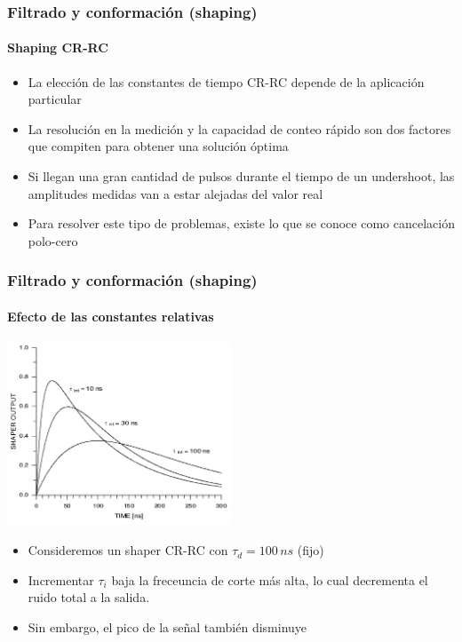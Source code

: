 \documentclass{beamer}
\begin{document}
\begin{frame}
\frametitle{Filtrado y conformación (shaping)}
\framesubtitle{{\color{blue}Shaping CR-RC}}
\begin{itemize}
\item La elección de las constantes de tiempo CR-RC depende de la aplicación
particular
\item La resolución en la medición y la capacidad de conteo rápido son dos
factores que compiten para obtener una solución {\color{blue}óptima} 
\item Si llegan una gran cantidad de pulsos durante el tiempo de un undershoot,
las amplitudes medidas van a estar alejadas del valor real 
\item Para resolver este tipo de problemas, existe lo que se conoce como
{\color{blue}cancelación polo-cero}
\end{itemize}
\end{frame}

\begin{frame}
\frametitle{Filtrado y conformación (shaping)}
\framesubtitle{{\color{blue}Efecto de las constantes relativas}}
\begin{center}
\includegraphics[width=0.5\textwidth]{d2/efecto_tc_shaping}
\end{center}
\begin{itemize}
\item Consideremos un shaper CR-RC con $\tau_d = 100\,ns$ (fijo)
\item Incrementar $\tau_i$ baja la freceuncia de corte más alta, lo cual
decrementa el ruido total a la salida.
\item Sin embargo, el pico de la señal también disminuye
\end{itemize}
\end{frame}
\end{document}
